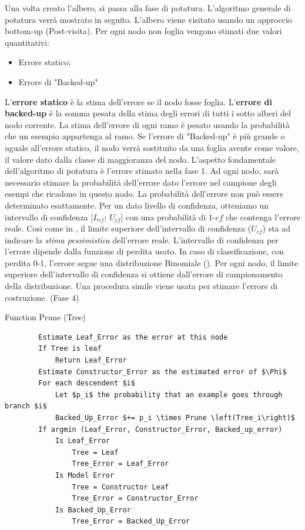 Una volta creato l'albero, si passa alla fase di potatura. L'algoritmo generale di potatura verrà mostrato in seguito. L'albero viene visitato usando un approccio bottom-up (Post-visita). Per ogni nodo non foglia vengono stimati due valori quantitativi: 
\begin{itemize}
	\item Errore statico;
	\item Errore di "Backed-up"
\end{itemize}
L'\textbf{errore statico} è la stima dell'errore se il nodo fosse foglia.
L'\textbf{errore di backed-up} è la somma pesata della stima degli errori di tutti i sotto alberi del nodo corrente. La stima dell'errore di ogni ramo è pesato usando la probabilità che un esempio appartenga al ramo. Se l'errore di "Backed-up" è più grande o uguale all'errore statico, il nodo verrà sostituito da una foglia avente come valore, il valore dato dalla classe di maggioranza del nodo. L'aspetto fondamentale dell'algoritmo di potatura è l'errore stimato nella fase 1. Ad ogni nodo, sarà necessario stimare la probabilità dell'errore dato l'errore nel campione degli esempi che ricadono in questo nodo. La probabilità dell'errore non può essere determinato esattamente. Per un dato livello di confidenza, otteniamo un intervallo di confidenza [$L_{cf}$; $U_{cf}$] con una probabilità di 1-$cf$ che contenga l'errore reale. Cosi come in \cite{Quinlan:1993a}, il limite superiore dell'intervallo di confidenza ($U_{cf}$) sta ad indicare la \emph{stima pessimistica} dell'errore reale. L'intervallo di confidenza per l'errore dipende dalla funzione di perdita usato. In caso di classificazione, con perdita 0-1, l'errore segue una distribuzione Binomiale (\cite{mitchellbook}). Per ogni nodo, il limite superiore dell'intervallo di confidenza si ottiene dall'errore di campionamento della distribuzione.
Una procedura simile viene usata per stimare l'errore di costruzione. (Fase 4)


\begin{algorithm}
	\caption{Function Prune (Tree)}
	\begin{lstlisting}
		Estimate Leaf_Error as the error at this node
		If Tree is leaf 
			Return Leaf_Error
		Estimate Constructor_Error as the estimated error of $\Phi$
		For each descendent $i$
			Let $p_i$ the probability that an example goes through branch $i$
			Backed_Up_Error $+= p_i \times Prune \left(Tree_i\right)$
		If argmin (Leaf_Error, Constructor_Error, Backed_up_error)
			Is Leaf_Error
				Tree = Leaf
				Tree_Error = Leaf_Error
			Is Model Error
				Tree = Constructor Leaf
				Tree_Error = Constructor_Error
			Is Backed_Up_Error
				Tree_Error = Backed_Up_Error
	\end{lstlisting}
\end{algorithm}

